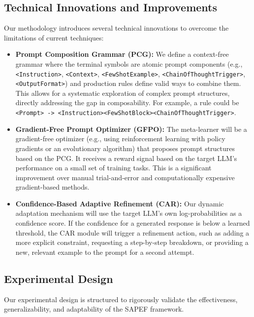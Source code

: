 \documentclass{article}
\begin{document}
\subsection{Technical Innovations and Improvements}
Our methodology introduces several technical innovations to overcome the limitations of current techniques:
\begin{itemize}
    \item \textbf{Prompt Composition Grammar (PCG):} We define a context-free grammar where the terminal symbols are atomic prompt components (e.g., \texttt{<Instruction>}, \texttt{<Context>}, \texttt{<FewShotExample>}, \texttt{<ChainOfThoughtTrigger>}, \texttt{<OutputFormat>}) and production rules define valid ways to combine them. This allows for a systematic exploration of complex prompt structures, directly addressing the gap in composability. For example, a rule could be \texttt{<Prompt> -> <Instruction><FewShotBlock><ChainOfThoughtTrigger>}.
    \item \textbf{Gradient-Free Prompt Optimizer (GFPO):} The meta-learner will be a gradient-free optimizer (e.g., using reinforcement learning with policy gradients or an evolutionary algorithm) that proposes prompt structures based on the PCG. It receives a reward signal based on the target LLM's performance on a small set of training tasks. This is a significant improvement over manual trial-and-error and computationally expensive gradient-based methods.
    \item \textbf{Confidence-Based Adaptive Refinement (CAR):} Our dynamic adaptation mechanism will use the target LLM's own log-probabilities as a confidence score. If the confidence for a generated response is below a learned threshold, the CAR module will trigger a refinement action, such as adding a more explicit constraint, requesting a step-by-step breakdown, or providing a new, relevant example to the prompt for a second attempt.
\end{itemize}

\subsection{Experimental Design}
Our experimental design is structured to rigorously validate the effectiveness, generalizability, and adaptability of the SAPEF framework.
\end{document}
